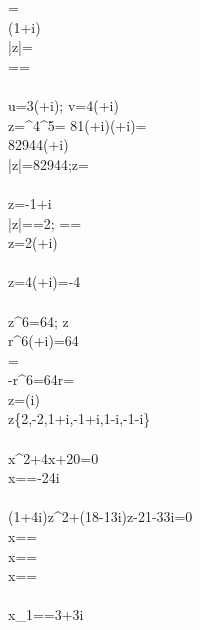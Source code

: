 =\\
(1+i)\\
|z|=\\
==
\\\Large{}\normalsize\\
u=3(+i);
v=4(+i)\\
z=^4\cdot{}^5=
81(+i)(+i)=\\
82944(+i)\\
|z|=82944;\arg z=
\\\Large{}\normalsize\\
z=-1+i\\
|z|==2;
==\\
z=2(+i)
\\\Large{}\normalsize\\
z=4(\cos{\pi}+i\sin{\pi})=-4
\\\Large{}\normalsize\\
z^6=64; z\in\cnums\\
r^6(\cos{6\varphi}+i\sin{6\varphi})=64\\
\varphi=\pm{}\\
-r^6=64\rArr r=\\
z=(\pm i)\\
z\in\{2,-2,1+i,-1+i,1-i,-1-i\}
\\\Large{}\normalsize\\
x^2+4x+20=0\\
x==-2\pm4i
\\\Large{}\normalsize\\
(1+4i)z^2+(18-13i)z-21-33i=0\\
x==\\
x==\\
x==\\
\\
x_1==3+3i\\
